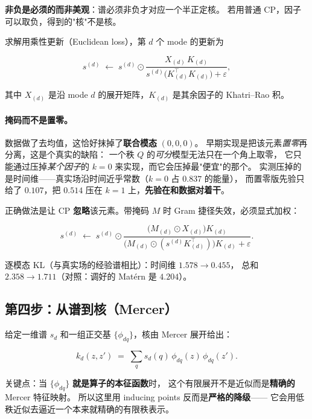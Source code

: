 \documentclass[11pt,a4paper]{article}
\begin{document}
\textbf{非负是必须的而非美观}：谱必须非负才对应一个半正定核。
若用普通 CP，因子可以取负，得到的"核"不是核。

求解用乘性更新（Euclidean loss），第 $d$ 个 mode 的更新为

\begin{equation}
s^{(d)} \;\leftarrow\; s^{(d)} \odot
  \frac{X_{(d)} \, K_{(d)}}{s^{(d)} \bigl(K_{(d)}^\top K_{(d)}\bigr) + \varepsilon},
\end{equation}

其中 $X_{(d)}$ 是沿 mode $d$ 的展开矩阵，$K_{(d)}$ 是其余因子的 Khatri--Rao 积。

\paragraph{掩码而不是置零。}
数据做了去均值，这恰好抹掉了\textbf{联合模态} $(0,0,0)$。
早期实现是把该元素\emph{置零}再分离，这是个真实的缺陷：
一个秩 $Q$ 的\emph{可分}模型无法只在一个角上取零，
它只能通过压掉\emph{某个因子}的 $k=0$ 来实现，而它会压掉最"便宜"的那个。
实测压掉的是时间维——真实场沿时间近乎常数（$k=0$ 占 $0.837$ 的能量），
而置零版先验只给了 $0.107$，把 $0.514$ 压在 $k=1$ 上，\textbf{先验在和数据对着干}。

正确做法是让 CP \textbf{忽略}该元素。带掩码 $M$ 时 Gram 捷径失效，必须显式加权：

\begin{equation}
s^{(d)} \;\leftarrow\; s^{(d)} \odot
  \frac{\bigl(M_{(d)} \odot X_{(d)}\bigr) K_{(d)}}
       {\bigl(M_{(d)} \odot (s^{(d)} K_{(d)}^\top)\bigr) K_{(d)} + \varepsilon}.
\end{equation}

逐模态 KL（与真实场的经验谱相比）：时间维 $1.578 \to 0.455$，
总和 $2.358 \to 1.711$（对照：调好的 Matérn 是 $4.204$）。

\subsection{第四步：从谱到核（Mercer）}

给定一维谱 $s_d$ 和一组正交基 $\{\phi_{dq}\}$，核由 Mercer 展开给出：

\begin{equation}
k_d(z, z') \;=\; \sum_{q} s_d(q) \, \phi_{dq}(z) \, \phi_{dq}(z') .
\end{equation}

关键点：当 $\{\phi_{dq}\}$ \textbf{就是算子的本征函数}时，
这个有限展开不是近似而是\textbf{精确的} Mercer 特征映射。
所以这里用 inducing points 反而是\textbf{严格的降级}——
它会用低秩近似去逼近一个本来就精确的有限秩表示。
\end{document}
